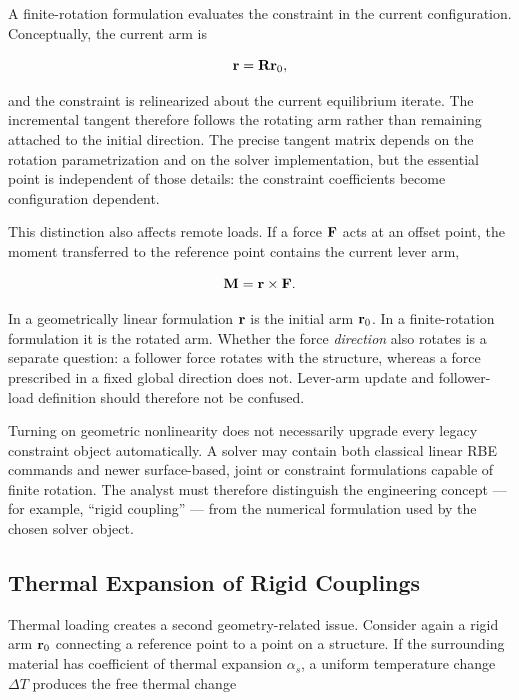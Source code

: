 A finite-rotation formulation evaluates the constraint in the current
configuration. Conceptually, the current arm is

\begin{equation}
    \mathbf{r}=\mathbf{R}\mathbf{r}_0,
\end{equation}

and the constraint is relinearized about the current equilibrium iterate. The
incremental tangent therefore follows the rotating arm rather than remaining
attached to the initial direction. The precise tangent matrix depends on the
rotation parametrization and on the solver implementation, but the essential
point is independent of those details: the constraint coefficients become
configuration dependent.

This distinction also affects remote loads. If a force $\mathbf{F}$ acts at an offset
point, the moment transferred to the reference point contains the current lever
arm,

\begin{equation}
    \mathbf{M}=\mathbf{r}\times\mathbf{F}.
\end{equation}

In a geometrically linear formulation $\mathbf{r}$ is the initial arm $\mathbf{r}_0$.
In a finite-rotation formulation it is the rotated arm. Whether the force
\emph{direction} also rotates is a separate question: a follower force rotates
with the structure, whereas a force prescribed in a fixed global direction does
not. Lever-arm update and follower-load definition should therefore not be
confused.

Turning on geometric nonlinearity does not necessarily upgrade every legacy
constraint object automatically. A solver may contain both classical linear
RBE commands and newer surface-based, joint or constraint formulations capable
of finite rotation. The analyst must therefore distinguish the engineering
concept --- for example, ``rigid coupling'' --- from the numerical formulation
used by the chosen solver object.

\subsection{Thermal Expansion of Rigid Couplings}\label{sec:rbe-thermal-expansion}

Thermal loading creates a second geometry-related issue. Consider again a rigid
arm $\mathbf{r}_0$ connecting a reference point to a point on a structure. If the
surrounding material has coefficient of thermal expansion $\alpha_s$, a uniform
temperature change $\Delta T$ produces the free thermal change

